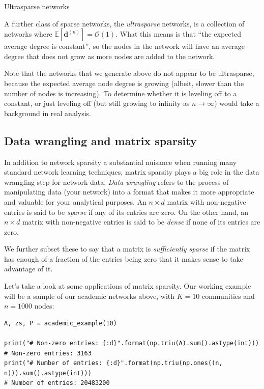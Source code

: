 \begin{floatingbox}[h]\caption{Ultrasparse networks}
A further class of sparse networks, the \textit{ultrasparse} networks, is a collection of networks where $\mathbb E[\mathbf d^{(n)}]= \mathcal O(1)$. What this means is that ``the expected average degree is constant'', so the nodes in the network will have an average degree that does not grow as more nodes are added to the network. 

Note that the networks that we generate above do not appear to be ultrasparse, because the expected average node degree is growing (albeit, slower than the number of nodes is increasing). To determine whether it is leveling off to a constant, or just leveling off (but still growing to infinity as $n \rightarrow \infty$) would take a background in real analysis.
\end{floatingbox}

\subsection{Data wrangling and matrix sparsity}

In addition to network sparsity a substantial nuisance when running many standard network learning techniques, matrix sparsity plays a big role in the data wrangling step for network data. \textit{Data wrangling} refers to the process of manipulating data (your network) into a format that makes it more appropriate and valuable for your analytical purposes. An $n \times d$ matrix with non-negative entries is said to be \textit{sparse} if any of its entries are zero. On the other hand, an $n \times d$ matrix with non-negative entries is said to be \textit{dense} if none of its entries are zero.

We further subset these to say that a matrix is \textit{sufficiently sparse} if the matrix has enough of a fraction of the entries being zero that it makes sense to take advantage of it.

Let's take a look at some applications of matrix sparsity. Our working example will be a sample of our academic networks above, with $K = 10$ communities and $n=1000$ nodes:

\begin{lstlisting}[style=python]
A, zs, P = academic_example(10)

print("# Non-zero entries: {:d}".format(np.triu(A).sum().astype(int)))
# Non-zero entries: 3163
print("# Number of entries: {:d}".format(np.triu(np.ones((n, n))).sum().astype(int)))
# Number of entries: 20483200
\end{lstlisting}

